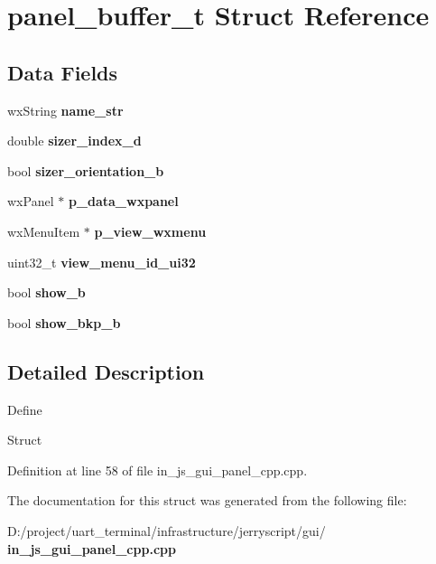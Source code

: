 \section{panel\+\_\+buffer\+\_\+t Struct Reference}
\label{structpanel__buffer__t}
\subsection*{Data Fields}
\begin{DoxyCompactItemize}
\item 
\mbox{\label{structpanel__buffer__t_a4f420117d8c68001f3c555687fee0d84}} 
wx\+String {\bfseries name\+\_\+str}
\item 
\mbox{\label{structpanel__buffer__t_aae99f717aadbf88f890c71a293468af8}} 
double {\bfseries sizer\+\_\+index\+\_\+d}
\item 
\mbox{\label{structpanel__buffer__t_a7dac49d74e11d058f831963b78f5ecb9}} 
bool {\bfseries sizer\+\_\+orientation\+\_\+b}
\item 
\mbox{\label{structpanel__buffer__t_a4342aca05065302b62ea53a407774a35}} 
wx\+Panel $\ast$ {\bfseries p\+\_\+data\+\_\+wxpanel}
\item 
\mbox{\label{structpanel__buffer__t_a5596946077268c9395c33ae5ad5e04d6}} 
wx\+Menu\+Item $\ast$ {\bfseries p\+\_\+view\+\_\+wxmenu}
\item 
\mbox{\label{structpanel__buffer__t_a04b311415a54fe69464219256782da9f}} 
uint32\+\_\+t {\bfseries view\+\_\+menu\+\_\+id\+\_\+ui32}
\item 
\mbox{\label{structpanel__buffer__t_a5c34bdc6bd8cb67d0828a24d72c432a5}} 
bool {\bfseries show\+\_\+b}
\item 
\mbox{\label{structpanel__buffer__t_a07f6d19b6e7f6288b31022232331bdba}} 
bool {\bfseries show\+\_\+bkp\+\_\+b}
\end{DoxyCompactItemize}


\subsection{Detailed Description}
Define

Struct 

Definition at line 58 of file in\+\_\+js\+\_\+gui\+\_\+panel\+\_\+cpp.\+cpp.



The documentation for this struct was generated from the following file\+:\begin{DoxyCompactItemize}
\item 
D\+:/project/uart\+\_\+terminal/infrastructure/jerryscript/gui/\textbf{ in\+\_\+js\+\_\+gui\+\_\+panel\+\_\+cpp.\+cpp}\end{DoxyCompactItemize}
